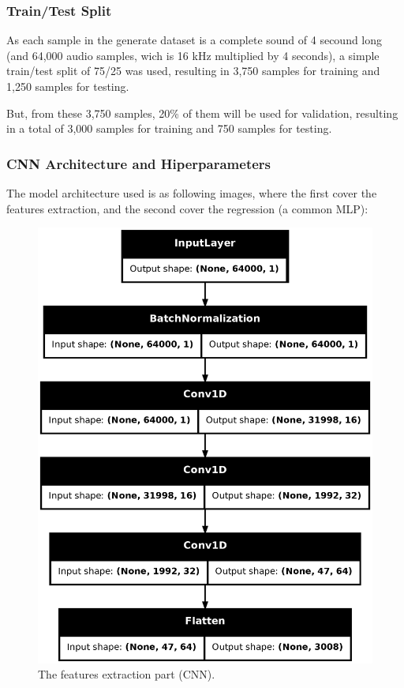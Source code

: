 \documentclass[sigconf,natbib=false]{acmart}
\begin{document}
\subsubsection{Train/Test Split}

As each sample in the generate dataset is a complete sound of 4 secound long (and 64,000 audio samples, wich is 16 kHz multiplied by 4 seconds), a simple train/test split of 75/25 was used, resulting in 3,750 samples for training and 1,250 samples for testing.

But, from these 3,750 samples, 20\% of them will be used for validation, resulting in a total of 3,000 samples for training and 750 samples for testing.

\subsubsection{CNN Architecture and Hiperparameters}

The model architecture used is as following images, where the first cover the features extraction, and the second cover the regression (a common MLP):

\begin{figure}[h]
 \centering
 \includegraphics[width=0.8\linewidth]{figs/projecao.png}
 \caption{The features extraction part (CNN).}
\end{figure}
\end{document}
